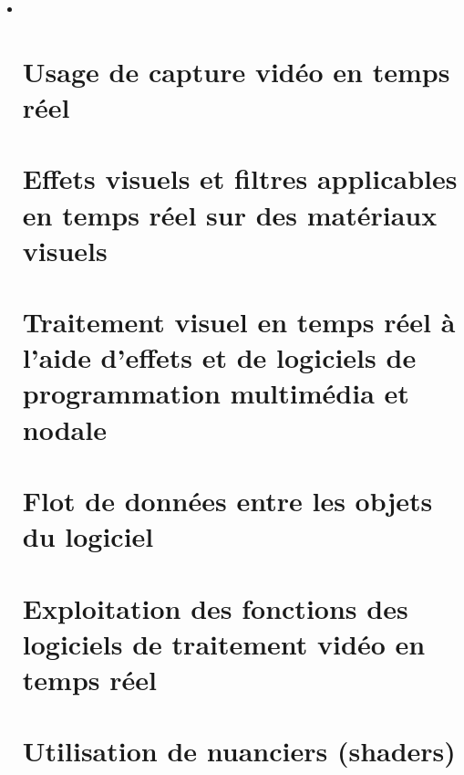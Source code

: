 \documentclass[
]{book}
\begin{document}
\begin{itemize}
\item ~
  \hypertarget{usage-de-capture-viduxe9o-en-temps-ruxe9el}{%
  \section{Usage de capture vidéo en temps réel}\label{usage-de-capture-viduxe9o-en-temps-ruxe9el}}

  \hypertarget{effets-visuels-et-filtres-applicables-en-temps-ruxe9el-sur-des-matuxe9riaux-visuels}{%
  \section{Effets visuels et filtres applicables en temps réel sur des matériaux visuels}\label{effets-visuels-et-filtres-applicables-en-temps-ruxe9el-sur-des-matuxe9riaux-visuels}}

  \hypertarget{traitement-visuel-en-temps-ruxe9el-uxe0-laide-deffets-et-de-logiciels-de-programmation-multimuxe9dia-et-nodale}{%
  \section{Traitement visuel en temps réel à l'aide d'effets et de logiciels de programmation multimédia et nodale}\label{traitement-visuel-en-temps-ruxe9el-uxe0-laide-deffets-et-de-logiciels-de-programmation-multimuxe9dia-et-nodale}}

  \hypertarget{flot-de-donnuxe9es-entre-les-objets-du-logiciel}{%
  \section{Flot de données entre les objets du logiciel}\label{flot-de-donnuxe9es-entre-les-objets-du-logiciel}}

  \hypertarget{exploitation-des-fonctions-des-logiciels-de-traitement-viduxe9o-en-temps-ruxe9el}{%
  \section{Exploitation des fonctions des logiciels de traitement vidéo en temps réel}\label{exploitation-des-fonctions-des-logiciels-de-traitement-viduxe9o-en-temps-ruxe9el}}

  \hypertarget{utilisation-de-nuanciers-shaders}{%
  \section{Utilisation de nuanciers (shaders)}\label{utilisation-de-nuanciers-shaders}}
\end{itemize}
\end{document}
